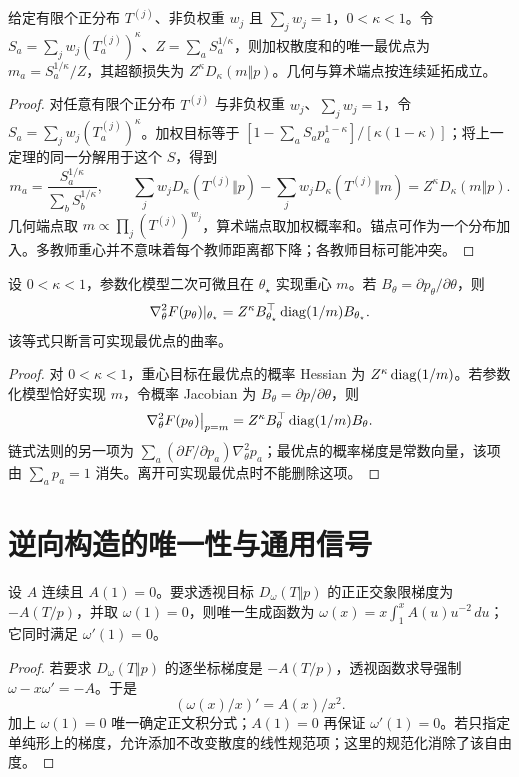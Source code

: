 \begin{theorem}[多教师幂均值重心]
给定有限个正分布 $T^{(j)}$、非负权重 $w_j$ 且 $\sum_jw_j=1$，$0<\kappa<1$。令 $S_a=\sum_jw_j(T_a^{(j)})^\kappa$、$Z=\sum_aS_a^{1/\kappa}$，则加权散度和的唯一最优点为 $m_a=S_a^{1/\kappa}/Z$，其超额损失为 $Z^\kappa D_\kappa(m\Vert p)$。几何与算术端点按连续延拓成立。
\end{theorem}
\begin{proof}
对任意有限个正分布 $T^{(j)}$ 与非负权重 $w_j$、$\sum_jw_j=1$，令 $S_a=\sum_jw_j(T_a^{(j)})^\kappa$。加权目标等于 $[1-\sum_aS_ap_a^{1-\kappa}]/[\kappa(1-\kappa)]$；将上一定理的同一分解用于这个 $S$，得到
\begin{equation}
m_a=\frac{S_a^{1/\kappa}}{\sum_bS_b^{1/\kappa}},
\qquad
\sum_jw_jD_\kappa(T^{(j)}\Vert p)
-\sum_jw_jD_\kappa(T^{(j)}\Vert m)
=Z^\kappa D_\kappa(m\Vert p).
\end{equation}
几何端点取 $m\propto\prod_j(T^{(j)})^{w_j}$，算术端点取加权概率和。锚点可作为一个分布加入。多教师重心并不意味着每个教师距离都下降；各教师目标可能冲突。
\end{proof}

\begin{proposition}[可实现重心处的参数曲率]
设 $0<\kappa<1$，参数化模型二次可微且在 $\theta_\star$ 实现重心 $m$。若 $B_\theta=\partial p_\theta/\partial\theta$，则
\begin{equation}
\nabla_\theta^2F(p_\theta)|_{\theta_\star}
=Z^\kappa B_{\theta_\star}^\top\operatorname{diag}(1/m)B_{\theta_\star}.
\end{equation}
该等式只断言可实现最优点的曲率。
\end{proposition}
\begin{proof}
对 $0<\kappa<1$，重心目标在最优点的概率 Hessian 为 $Z^\kappa\operatorname{diag}(1/m)$。若参数化模型恰好实现 $m$，令概率 Jacobian 为 $B_\theta=\partial p/\partial\theta$，则
\begin{equation}
\nabla_\theta^2F(p_\theta)\big|_{p=m}
=Z^\kappa B_\theta^\top\operatorname{diag}(1/m)B_\theta.
\end{equation}
链式法则的另一项为 $\sum_a(\partial F/\partial p_a)\nabla_\theta^2p_a$；最优点的概率梯度是常数向量，该项由 $\sum_ap_a=1$ 消失。离开可实现最优点时不能删除这项。
\end{proof}

\section{逆向构造的唯一性与通用信号}
\begin{proposition}[逆向积分的唯一性]
设 $A$ 连续且 $A(1)=0$。要求透视目标 $D_\omega(T\Vert p)$ 的正正交象限梯度为 $-A(T/p)$，并取 $\omega(1)=0$，则唯一生成函数为 $\omega(x)=x\int_1^xA(u)u^{-2}\,du$；它同时满足 $\omega'(1)=0$。
\end{proposition}
\begin{proof}
若要求 $D_\omega(T\Vert p)$ 的逐坐标梯度是 $-A(T/p)$，透视函数求导强制 $\omega-x\omega'=-A$。于是
\begin{equation}
(\omega(x)/x)'=A(x)/x^2.
\end{equation}
加上 $\omega(1)=0$ 唯一确定正文积分式；$A(1)=0$ 再保证 $\omega'(1)=0$。若只指定单纯形上的梯度，允许添加不改变散度的线性规范项；这里的规范化消除了该自由度。
\end{proof}

